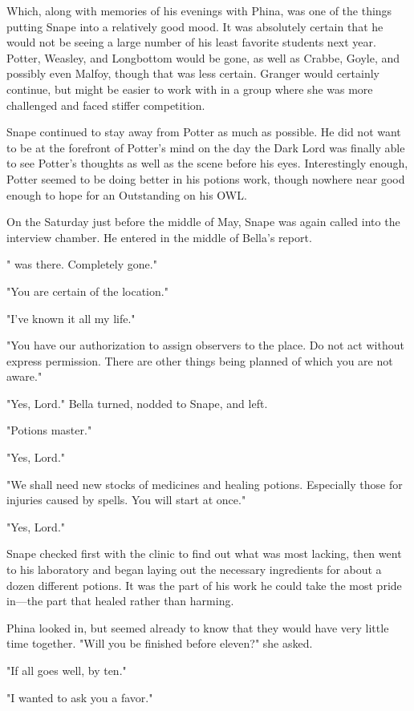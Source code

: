 Which, along with memories of his evenings with Phina, was one of the things putting Snape into a relatively good mood. It was absolutely certain that he would not be seeing a large number of his least favorite students next year. Potter, Weasley, and Longbottom would be gone, as well as Crabbe, Goyle, and possibly even Malfoy, though that was less certain. Granger would certainly continue, but might be easier to work with in a group where she was more challenged and faced stiffer competition.

Snape continued to stay away from Potter as much as possible. He did not want to be at the forefront of Potter's mind on the day the Dark Lord was finally able to see Potter's thoughts as well as the scene before his eyes. Interestingly enough, Potter seemed to be doing better in his potions work, though nowhere near good enough to hope for an Outstanding on his OWL.

On the Saturday just before the middle of May, Snape was again called into the interview chamber. He entered in the middle of Bella's report.

"{\el} was there. Completely gone."

"You are certain of the location."

"I've known it all my life."

"You have our authorization to assign observers to the place. Do not act without express permission. There are other things being planned of which you are not aware."

"Yes, Lord." Bella turned, nodded to Snape, and left.

"Potions master."

"Yes, Lord."

"We shall need new stocks of medicines and healing potions. Especially those for injuries caused by spells. You will start at once."

"Yes, Lord."

Snape checked first with the clinic to find out what was most lacking, then went to his laboratory and began laying out the necessary ingredients for about a dozen different potions. It was the part of his work he could take the most pride in—the part that healed rather than harming.

Phina looked in, but seemed already to know that they would have very little time together. "Will you be finished before eleven?" she asked.

"If all goes well, by ten."

"I wanted to ask you a favor."

